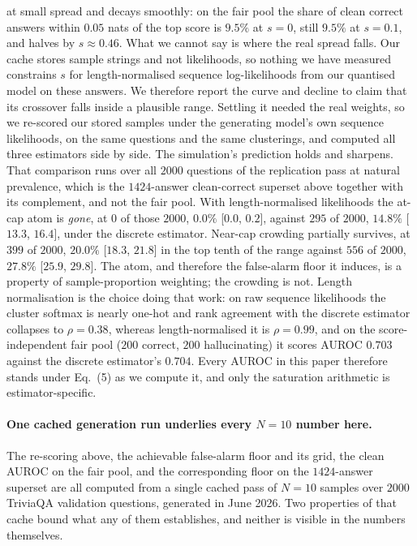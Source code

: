 at small spread and decays smoothly: on the fair pool the share of clean correct answers
within $0.05$ nats of the top score is $9.5\%$ at $s{=}0$, still $9.5\%$ at $s{=}0.1$, and
halves by $s \approx 0.46$. What we cannot say is where the real spread falls. Our cache
stores sample strings and not likelihoods, so nothing we have measured constrains $s$ for
length-normalised sequence log-likelihoods from our quantised model on these answers. We
therefore report the curve and decline to claim that its crossover falls inside a plausible
range. Settling it needed the real weights, so we re-scored our stored samples under the
generating model's own sequence likelihoods, on the same questions and the same clusterings,
and computed all three estimators side by side. The simulation's prediction holds and
sharpens. That comparison runs over all $2000$ questions of the replication pass at natural
prevalence, which is the $1424$-answer clean-correct superset above together with its
complement, and not the fair pool. With length-normalised likelihoods the at-cap atom is
\emph{gone}, at $0$ of those $2000$, $0.0\%$ [$0.0$, $0.2$], against $295$ of $2000$,
$14.8\%$ [$13.3$, $16.4$], under the discrete estimator. Near-cap crowding partially
survives, at $399$ of $2000$, $20.0\%$ [$18.3$, $21.8$] in the top tenth of the range against
$556$ of $2000$, $27.8\%$ [$25.9$, $29.8$]. The atom, and therefore the false-alarm floor it
induces, is a property of sample-proportion weighting; the crowding is not. Length
normalisation is the choice doing that work: on raw sequence likelihoods the cluster softmax
is nearly one-hot and rank agreement with the discrete estimator collapses to $\rho{=}0.38$,
whereas length-normalised it is $\rho{=}0.99$, and on the score-independent fair pool ($200$
correct, $200$ hallucinating) it scores AUROC $0.703$ against the discrete estimator's
$0.704$. Every AUROC in this paper therefore stands under Eq.~(5) as we compute it, and only
the saturation arithmetic is estimator-specific.

\paragraph{One cached generation run underlies every $N{=}10$ number here.}
The re-scoring above, the achievable false-alarm floor and its grid, the clean AUROC on the
fair pool, and the corresponding floor on the $1424$-answer superset are all computed from a
single cached pass of $N{=}10$ samples over $2000$ TriviaQA validation questions, generated in
June 2026. Two properties of that cache bound what any of them establishes, and neither is
visible in the numbers themselves.

